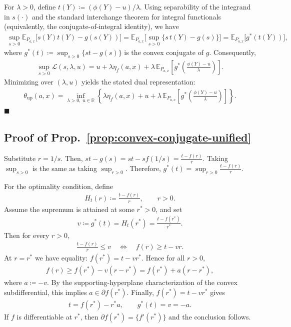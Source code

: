 For $\lambda>0$, define $t(Y)\coloneqq (\phi(Y)-u)/\lambda$. Using separability of the
integrand in $s(\cdot)$ and the standard interchange theorem for integral functionals
(equivalently, the conjugate-of-integral identity), we have
\begin{align}
\sup_{s>0}\mathbb{E}_{P_{a,x}}\!\bigl[s(Y)t(Y)-g(s(Y))\bigr]
= \mathbb{E}_{P_{a,x}}\!\Big[\sup_{s>0}\{s\,t(Y)-g(s)\}\Big]
= \mathbb{E}_{P_{a,x}}\!\bigl[g^*(t(Y))\bigr],
\end{align}
where $g^*(t)\coloneqq \sup_{s>0}\{st-g(s)\}$ is the convex conjugate of $g$.
Consequently,
\begin{align}
\sup_{s>0}\mathcal{L}(s,\lambda,u)
= u + \lambda \eta_f(a,x) + \lambda\,\mathbb{E}_{P_{a,x}}
\!\left[g^*\!\left(\frac{\phi(Y)-u}{\lambda}\right)\right].
\end{align}
Minimizing over $(\lambda,u)$ yields the stated dual representation:
\begin{align}
\theta_{\mathrm{up}}(a,x)
= \inf_{\lambda>0,\;u\in\mathbb{R}}
\left\{\lambda \eta_f(a,x) + u + \lambda\,\mathbb{E}_{P_{a,x}}
\!\left[g^*\!\left(\frac{\phi(Y)-u}{\lambda}\right)\right]\right\}.
\end{align}
\hfill $\blacksquare$


\subsection*{Proof of Prop.~\ref{prop:convex-conjugate-unified}}
    Substitute $r = 1/s$. Then, $st-g(s)=st-s f(1/s)=\frac{t-f(r)}{r}$. Taking $\sup_{s > 0}$ is the same as taking $\sup_{r > 0}$. Therefore, $g^{\ast}(t) = \sup_{r > 0} \frac{t-f(r)}{r}$.

    For the optimality condition, define
    \begin{align}
        H_t(r) \coloneqq \frac{t - f(r)}{r}, \qquad r>0.
    \end{align}
    Assume the supremum is attained at some $r^\ast>0$, and set
    \begin{align}
        v \coloneqq g^\ast(t) = H_t(r^\ast) = \frac{t - f(r^\ast)}{r^\ast}.
    \end{align}
    Then for every $r>0$,
    \begin{align}
        \frac{t - f(r)}{r} \le v
        \quad\Longleftrightarrow\quad
        f(r) \ge t - v r.
    \end{align}
    At $r=r^\ast$ we have equality: $f(r^\ast)=t-vr^\ast$. Hence for all $r>0$,
    \begin{align}
        f(r) \ge f(r^\ast) - v(r-r^\ast) = f(r^\ast) + a(r-r^\ast),
    \end{align}
    where $a\coloneqq -v$. By the supporting-hyperplane characterization of the convex subdifferential, this implies $a\in\partial f(r^\ast)$. Finally, $f(r^\ast)=t-vr^\ast$ gives
    \begin{align}
        t = f(r^\ast) - r^\ast a,
        \qquad
        g^\ast(t)=v=-a.
    \end{align}
    If $f$ is differentiable at $r^{\ast}$, then $\partial f(r^{\ast}) = \{f'(r^{\ast})\}$ and the conclusion follows. 

